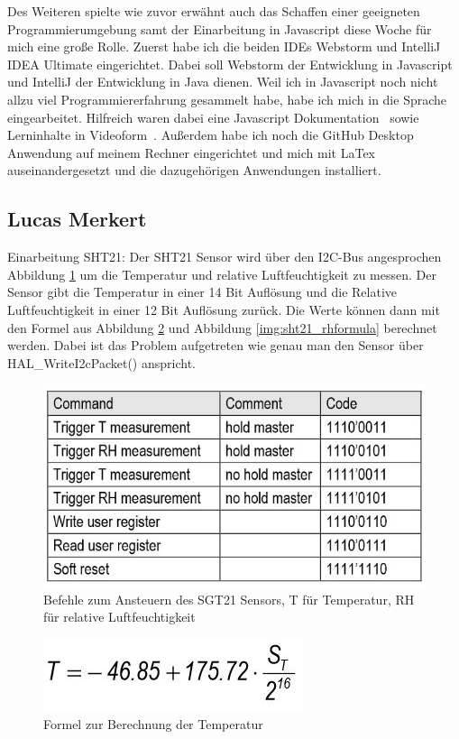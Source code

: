 \documentclass[]{article}
\begin{document}
Des Weiteren spielte wie zuvor erwähnt auch das Schaffen einer geeigneten Programmierumgebung samt der Einarbeitung in Javascript diese Woche für mich eine große Rolle. Zuerst habe ich die beiden IDEs Webstorm und IntelliJ IDEA Ultimate eingerichtet. Dabei soll Webstorm der Entwicklung in Javascript und IntelliJ der Entwicklung in Java dienen. Weil ich in Javascript noch nicht allzu viel Programmiererfahrung gesammelt habe, habe ich mich in die Sprache eingearbeitet. Hilfreich waren dabei eine Javascript Dokumentation~\cite{JS_docu} sowie Lerninhalte in Videoform~\cite{javascript_tut}. Außerdem habe ich noch die GitHub Desktop Anwendung auf meinem Rechner eingerichtet und mich mit LaTex auseinandergesetzt und die dazugehörigen Anwendungen installiert.

\subsection{Lucas Merkert}
Einarbeitung SHT21: Der SHT21 Sensor wird über den I2C-Bus angesprochen {Abbildung \ref{img:sht21_commandset}} um die Temperatur und relative Luftfeuchtigkeit zu messen. Der Sensor gibt die Temperatur in einer 14 Bit Auflösung und die Relative Luftfeuchtigkeit in einer 12 Bit Auflösung zurück. Die Werte können dann mit den Formel aus {Abbildung \ref{img:sht21_tempformula}} und {Abbildung \ref{img:sht21_rhformula}} berechnet werden. Dabei ist das Problem aufgetreten wie genau man den Sensor über HAL\_WriteI2cPacket() anspricht.
\begin{figure}[h]
	\centering
	\includegraphics[scale=0.60]{images/sht21_commandset}
	\caption{Befehle zum Ansteuern des SGT21 Sensors, T für Temperatur, RH für relative Luftfeuchtigkeit~\cite{datasheetsht21}}
	\label{img:sht21_commandset}
\end{figure}
\begin{figure}[h]
	\centering
	\includegraphics[scale=0.60]{images/sht21_tempformula}
	\caption{Formel zur Berechnung der Temperatur~\cite{datasheetsht21}}
	\label{img:sht21_tempformula}
\end{figure}
\end{document}
